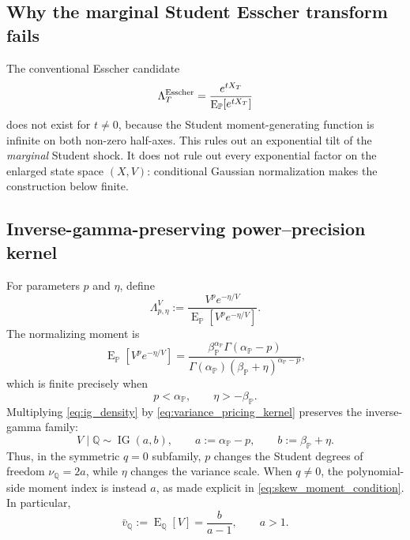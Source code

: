 \documentclass[11pt,a4paper]{article}
\DeclareMathOperator{\IG}{IG}
\DeclareMathOperator{\E}{E}
\begin{document}
\subsection{Why the marginal Student Esscher transform fails}

The conventional Esscher candidate
\begin{equation}
  \Lambda_T^{\rm Esscher}
  =\frac{e^{tX_T}}{\E_{\mathbb P}[e^{tX_T}]}
  \label{eq:invalid_student_esscher}
\end{equation}
does not exist for $t\ne0$, because the Student moment-generating function is
infinite on both non-zero half-axes.  This rules out an exponential tilt of
the \emph{marginal} Student shock.  It does not rule out every exponential
factor on the enlarged state space $(X,V)$: conditional Gaussian
normalization makes the construction below finite.

\subsection{Inverse-gamma-preserving power--precision kernel}

For parameters $p$ and $\eta$, define
\begin{equation}
  \Lambda_{p,\eta}^{V}
  :=
  \frac{V^p e^{-\eta/V}}
       {\E_{\mathbb P}[V^p e^{-\eta/V}]}.
  \label{eq:variance_pricing_kernel}
\end{equation}
The normalizing moment is
\begin{equation}
  \E_{\mathbb P}[V^p e^{-\eta/V}]
  =
  \frac{\beta_{\mathbb P}^{\alpha_{\mathbb P}}
        \Gamma(\alpha_{\mathbb P}-p)}
       {\Gamma(\alpha_{\mathbb P})
        (\beta_{\mathbb P}+\eta)^{\alpha_{\mathbb P}-p}},
  \label{eq:variance_kernel_normalizer}
\end{equation}
which is finite precisely when
\begin{equation}
  p<\alpha_{\mathbb P},\qquad
  \eta>-\beta_{\mathbb P}.
  \label{eq:static_kernel_admissibility}
\end{equation}
Multiplying \eqref{eq:ig_density} by \eqref{eq:variance_pricing_kernel}
preserves the inverse-gamma family:
\begin{equation}
  V\mid\mathbb Q\sim\IG(a,b),\qquad
  a:=\alpha_{\mathbb P}-p,\qquad
  b:=\beta_{\mathbb P}+\eta.
  \label{eq:q_ig_parameters}
\end{equation}
Thus, in the symmetric $q=0$ subfamily, $p$ changes the Student degrees of
freedom $\nu_{\mathbb Q}=2a$, while $\eta$ changes the variance scale.  When
$q\ne0$, the polynomial-side moment index is instead $a$, as made explicit
in \eqref{eq:skew_moment_condition}.  In particular,
\begin{equation}
  \bar v_{\mathbb Q}:=\E_{\mathbb Q}[V]
  =\frac{b}{a-1},\qquad a>1.
  \label{eq:q_mean_variance}
\end{equation}
\end{document}

